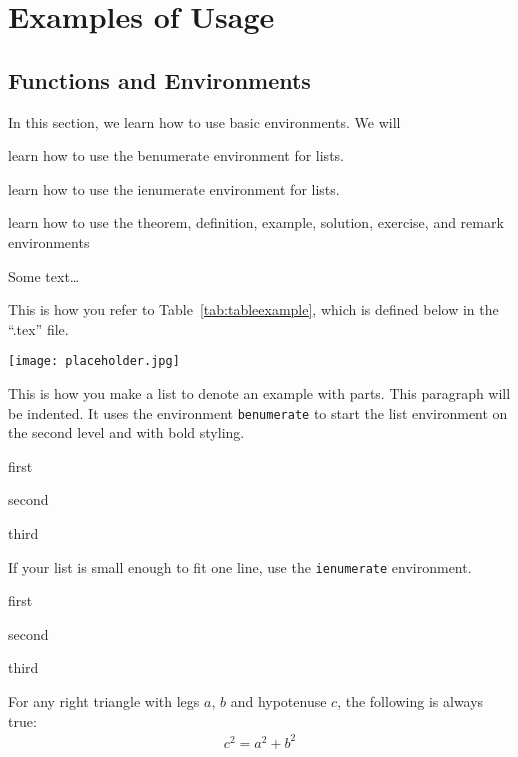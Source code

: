 \documentclass[10pt,oneside]{book}
\begin{document}
\chapter{Examples of Usage}


\section{Functions and Environments}

\begin{objectives}{In this section, we learn how to use basic environments. We will}
  \item
    learn how to use the benumerate environment for lists.
  \item
    learn how to use the ienumerate environment for lists.
  \item
    learn how to use the theorem, definition, example, solution, exercise, and remark environments
\end{objectives}


\noindent
Some text\ldots


This is how you refer to Table~\ref{tab:tableexample}, which is defined below in
the ``.tex'' file.


\begin{marginfigure}
    \texttt{[image: placeholder.jpg]}
    \caption{This is a how you put a figure in the margin.}
    \label{fig:marginfig2}
\end{marginfigure}


This is how you make a list to denote an example with parts. This paragraph will
be indented.  It uses the environment \texttt{benumerate} to start the list
environment on the second level and with bold styling. 
\begin{benumerate}
  \item first
  \item second
  \item third
\end{benumerate}

If your list is small enough to fit one line, use the \texttt{ienumerate}
environment.
\begin{ienumerate}
  \item first
  \item second
  \item third
\end{ienumerate}



\begin{theorem}
  For any right triangle with legs $a$, $b$  and hypotenuse $c$, the following
  is always true:
  \begin{align*}
    c^2 = a^2 + b^2
  \end{align*}
\end{theorem}
\end{document}
